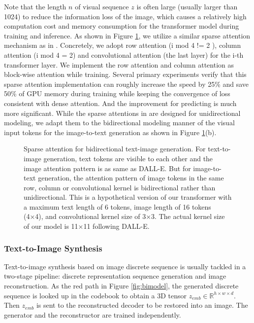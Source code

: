 \documentclass{article}
\begin{document}
Note that the length $n$ of visual sequence $z$ is often large (usually larger than 1024) to reduce the information loss of the image, which causes a relatively high computation cost and memory consumption for the transformer model during training and inference. As shown in Figure \ref{fig:sparse_attention}, we utilize a similar sparse attention mechanism as in \cite{ramesh2021zero}. Concretely, we adopt row attention (i mod 4 != 2 ),  column attention (i mod 4 = 2) and convolutional attention (the last layer) for the i-th transformer layer. We implement the row attention and column attention as block-wise attention while training. Several primary experiments verify that this sparse attention implementation can roughly increase the speed by 25\% and save 50\% of GPU memory during training while keeping the convergence of loss consistent with dense attention. And the improvement for predicting is much more significant. While the sparse attentions in \cite{ramesh2021zero} are designed for unidirectional modeling, we adapt them to the bidirectional modeling manner of the visual input tokens for the image-to-text generation as shown in Figure \ref{fig:sparse_attention}(b). 

\begin{figure}[htb]
    \centering
    \caption{Sparse attention for bidirectional text-image generation. For text-to-image generation, text tokens are visible to each other and the image attention pattern is as same as DALL-E. But for image-to-text generation, the attention pattern of image tokens in the same row, column or convolutional kernel is bidirectional rather than unidirectional. 
    This is a hypothetical version of our transformer with a maximum text length of 6 tokens, image length of 16 tokens (4×4), and convolutional kernel size of 3×3. The actual kernel size of our model is 11×11 following DALL-E.}
    \label{fig:sparse_attention}
\end{figure}

\subsubsection{Text-to-Image Synthesis}
Text-to-image synthesis based on image discrete sequence is usually tackled in a two-stage pipeline: discrete representation sequence generation and image reconstruction. As the red path in Figure \ref{fig:bimodel}, the generated discrete sequence is looked up in the codebook to obtain a 3D tensor $z_{emb} \in \mathbb{R}^{h \times w \times d}$. Then $z_{emb}$ is sent to the reconstructed decoder to be restored into an image. The generator and the reconstructor are trained independently. 
\end{document}
